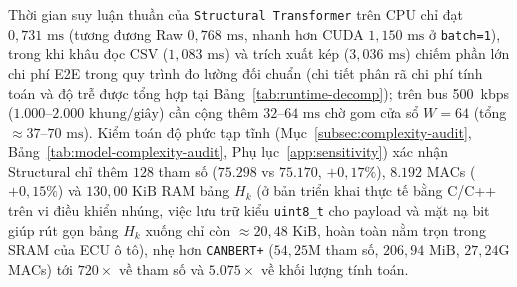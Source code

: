 \documentclass[12pt, a4paper, reqno, oneside]{book}
\DeclareRobustCommand{\code}[1]{\nolinkurl{#1}}
\begin{document}
Thời gian suy luận thuần của \code{Structural Transformer} trên CPU chỉ đạt $0{,}731\text{ ms}$ (tương đương Raw $0{,}768\text{ ms}$, nhanh hơn CUDA $1{,}150\text{ ms}$ ở \code{batch=1}), trong khi khâu đọc CSV ($1{,}083\text{ ms}$) và trích xuất kép ($3{,}036\text{ ms}$) chiếm phần lớn chi phí E2E trong quy trình đo lường đối chuẩn (chi tiết phân rã chi phí tính toán và độ trễ được tổng hợp tại Bảng~\ref{tab:runtime-decomp}); trên bus 500~kbps ($1.000\text{--}2.000\text{ khung/giây}$) cần cộng thêm $32\text{--}64\text{ ms}$ chờ gom cửa sổ $W=64$ (tổng $\approx 37\text{--}70\text{ ms}$). Kiểm toán độ phức tạp tĩnh (Mục~\ref{subsec:complexity-audit}, Bảng~\ref{tab:model-complexity-audit}, Phụ lục~\ref{app:sensitivity}) xác nhận Structural chỉ thêm $128$ tham số ($75.298$ vs $75.170$, $+0{,}17\%$), $8.192$ MACs ($+0{,}15\%$) và $130{,}00\text{ KiB}$ RAM bảng $H_k$ (ở bản triển khai thực tế bằng C/C++ trên vi điều khiển nhúng, việc lưu trữ kiểu \texttt{uint8\_t} cho payload và mặt nạ bit giúp rút gọn bảng $H_k$ xuống chỉ còn $\approx 20{,}48\text{ KiB}$, hoàn toàn nằm trọn trong SRAM của ECU ô tô), nhẹ hơn \code{CANBERT+} ($54{,}25\text{M}$ tham số, $206{,}94\text{ MiB}$, $27{,}24\text{G}$ MACs) tới $720\times$ về tham số và $5.075\times$ về khối lượng tính toán.
\end{document}
